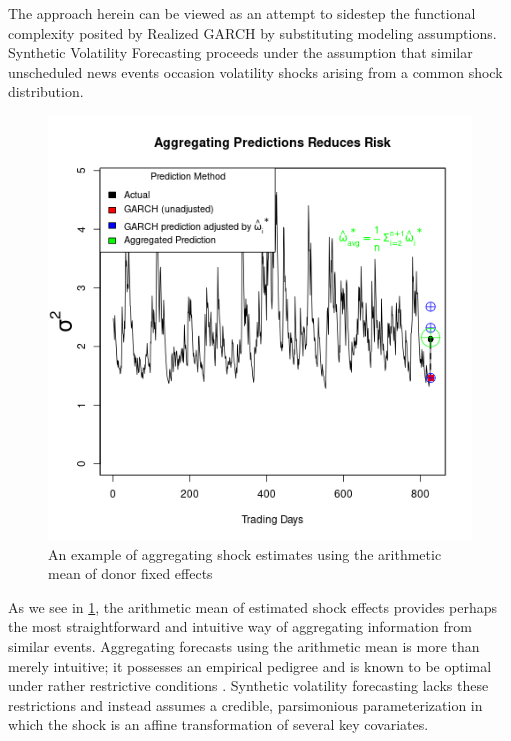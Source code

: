 \documentclass[11pt]{article}
\theoremstyle{definition}
\begin{document}
The approach herein can be viewed as an attempt to sidestep the functional complexity posited by Realized GARCH by substituting modeling assumptions.  Synthetic Volatility Forecasting proceeds under the assumption that similar unscheduled news events occasion volatility shocks arising from a common shock distribution.

\begin{figure}[h]
\begin{center}
  \includegraphics[scale=.5]{simulation_plots/USE_in_paper_simulation_plot_arithmetic_mean.png}
  \caption{An example of aggregating shock estimates using the arithmetic mean of donor fixed effects}
  \label{fig:arith_mean}
  \end{center}
\end{figure}

As we see in \ref{fig:arith_mean}, the arithmetic mean of estimated shock effects provides perhaps the most straightforward and intuitive way of aggregating information from similar events. Aggregating forecasts using the arithmetic mean is more than merely intuitive; it possesses an empirical pedigree and is known to be optimal under rather restrictive conditions \citep{timmermann2006forecast}.  Synthetic volatility forecasting lacks these restrictions and instead assumes a credible, parsimonious parameterization in which the shock is an affine transformation of several key covariates. \\
\end{document}
